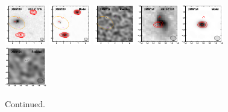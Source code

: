 \documentclass[iop]{emulateapj}
\begin{document}
\begin{figure}[!tbp]
\begin{centering}
\includegraphics[width=0.162\textwidth]{../Figures/modelfit/XMM119_optical_bestfit.pdf}
\includegraphics[width=0.162\textwidth]{../Figures/modelfit/XMM119_model_bestfit.pdf}
\includegraphics[width=0.162\textwidth]{../Figures/modelfit/XMM119_residual_bestfit.pdf}
\includegraphics[width=0.162\textwidth]{../Figures/modelfit/XMM124_optical_bestfit.pdf}
\includegraphics[width=0.162\textwidth]{../Figures/modelfit/XMM124_model_bestfit.pdf}
\includegraphics[width=0.162\textwidth]{../Figures/modelfit/XMM124_residual_bestfit.pdf}
\end{centering}

\caption{ Continued.}
\addtocounter{figure}{-1}

\end{figure}



\end{document}
